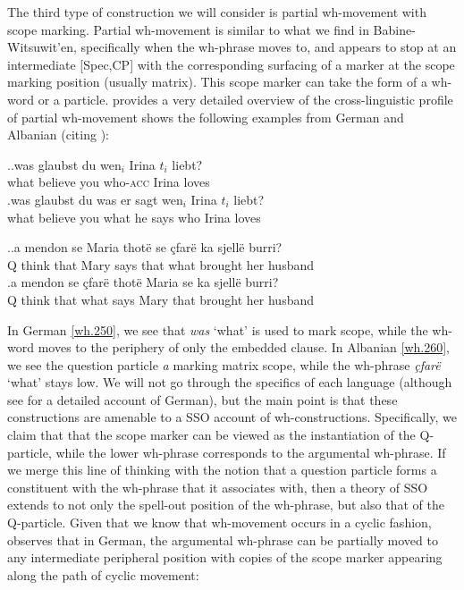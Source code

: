 \documentclass{glossa}
\begin{document}
The third type of construction we will consider is partial wh-movement with scope marking. Partial wh-movement is similar to what we find in Babine-Witsuwit'en, specifically when the wh-phrase moves to, and appears to stop at an intermediate [Spec,CP] with the corresponding surfacing of a marker at the scope marking position (usually matrix). This scope marker can take the form of a wh-word or a particle. \cite{fanselow:2006} provides a very detailed overview of the cross-linguistic profile of partial wh-movement shows the following examples from German and Albanian (citing \citealp{turano:1995}):

\ex.\label{wh.250}\ag.\label{wh.250a}was glaubst du wen$_i$ Irina $t_i$ liebt?\\
   what believe you who-\textsc{acc} Irina {} loves\\
   \bg.\label{wh.250b}was glaubst du was er sagt wen$_i$ Irina $t_i$ liebt?\\
   what believe you what he says who Irina loves\\

\ex.\label{wh.260}\ag.\label{wh.260a}a mendon se Maria thot\"e se \c{c}far\"e ka sjell\"e burri?\\
   Q think that Mary says that what brought her husband\\
   \bg.\label{wh.260b}a mendon se \c{c}far\"e thot\"e Maria se ka sjell\"e burri?\\
   Q think that what says Mary that brought her husband\\

In German \ref{wh.250}, we see that \textit{was} `what' is used to mark scope, while the wh-word moves to the periphery of only the embedded clause. In Albanian \ref{wh.260}, we see the question particle \textit{a} marking matrix scope, while the wh-phrase \textit{\c{c}far\"e} `what' stays low. We will not go through the specifics of each language (although see \citealp{fanselow-cavar:2000} for a detailed account of German), but the main point is that these constructions are amenable to a SSO account of wh-constructions. Specifically, we claim that that the scope marker can be viewed as the instantiation of the Q-particle, while the lower wh-phrase corresponds to the argumental wh-phrase. If we merge this line of thinking with the notion that a question particle forms a constituent with the wh-phrase that it associates with, then a theory of SSO extends to not only the spell-out position of the wh-phrase, but also that of the Q-particle. Given that we know that wh-movement occurs in a cyclic fashion, \cite{fanselow:2006} observes that in German, the argumental wh-phrase can be partially moved to any intermediate peripheral position with copies of the scope marker appearing along the path of cyclic movement:
\end{document}
